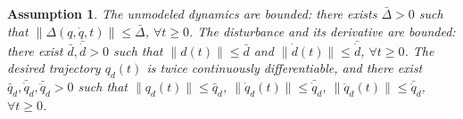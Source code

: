 \documentclass[pdflatex,sn-mathphys-num]{sn-jnl}%
\theoremstyle{thmstyleone}%
\newtheorem{assumption}{Assumption}
\theoremstyle{thmstyletwo}%
\theoremstyle{thmstylethree}%
\begin{document}
	\begin{assumption}  \label{assumption:2}
	The unmodeled dynamics are bounded: there exists $\bar{\Delta}>0$ such that
	$\|\Delta(q,\dot q,t)\|\le \bar{\Delta}$, $\forall t\ge 0$.
	The disturbance and its derivative are bounded: there exist $\bar d,\bar{\dot d}>0$ such that
	$\|d(t)\|\le \bar d$ and $\|\dot d(t)\|\le \bar{\dot d}$, $\forall t\ge 0$.
	The desired trajectory $q_d(t)$ is twice continuously differentiable, and there exist
	$\bar q_d,\bar{\dot q}_d,\bar{\ddot q}_d>0$ such that
	$\|q_d(t)\|\le \bar q_d$, $\|\dot q_d(t)\|\le \bar{\dot q}_d$,
	$\|\ddot q_d(t)\|\le \bar{\ddot q}_d$, $\forall t\ge 0$.
	\end{assumption}







\end{document}
